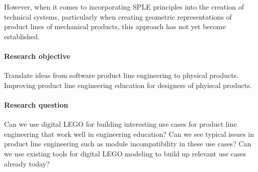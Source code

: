 \documentclass[sigconf,review]{acmart}
\begin{document}


However, when it comes to incorporating SPLE principles into the creation of technical systems, particularly when creating geometric representations of product lines of mechanical products, this approach has not yet become established. 


\paragraph{Research objective}

Translate ideas from software product line engineering to physical products.
Improving product line engineering education for designers of phyiscal products.

\paragraph{Research question}

Can we use digital LEGO for building interesting use cases for product line engineering that work well in engineering education?
Can we see typical issues in product line engineering such as module incompatibility in these use cases?
Can we use existing tools for digital LEGO modeling to build up relevant use cases already today?
\end{document}

